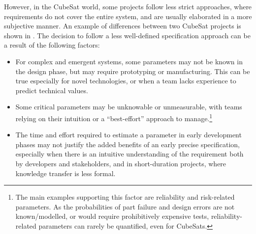 \documentclass[a4paper,nobib,justified,final]{tufte-book}
\begin{document}
However, in the CubeSat world, some projects follow less strict approaches, where requirements do not cover the entire system, and are usually elaborated in a more subjective manner. An example of differences between two CubeSat projects is shown in . The decision to follow a less well-defined specification approach can be a result of the following factors:
\begin{itemize}[itemsep=-1ex]
	\item For complex and emergent systems, some parameters may not be known in the design phase, but may require prototyping or manufacturing. This can be true especially for novel technologies, or when a team lacks experience to predict technical values.
	\item Some critical parameters may be unknowable or unmeasurable, with teams relying on their intuition or a ``best-effort'' approach to manage.\footnote{The main examples supporting this factor are reliability and risk-related parameters. As the probabilities of part failure and design errors are not known/modelled, or would require prohibitively expensive tests, reliability-related parameters can rarely be quantified, even for CubeSats.}
	\item The time and effort required to estimate a parameter in early development phases may not justify the added benefits of an early precise specification, especially when there is an intuitive understanding of the requirement both by developers and stakeholders, and in short-duration projects, where knowledge transfer is less formal.
\end{itemize}
\end{document}

